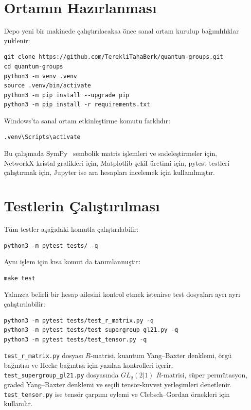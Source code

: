 \documentclass[12pt,a4paper,fleqn]{report}
\numberwithin{equation}{chapter}
\theoremstyle{plain}
\theoremstyle{definition}
\begin{document}
\section{Ortamın Hazırlanması}

Depo yeni bir makinede çalıştırılacaksa önce sanal ortam kurulup bağımlılıklar
yüklenir:
\begin{lstlisting}[style=bashblock]
git clone https://github.com/TerekliTahaBerk/quantum-groups.git
cd quantum-groups
python3 -m venv .venv
source .venv/bin/activate
python3 -m pip install --upgrade pip
python3 -m pip install -r requirements.txt
\end{lstlisting}

Windows'ta sanal ortam etkinleştirme komutu farklıdır:
\begin{lstlisting}[style=bashblock]
.venv\Scripts\activate
\end{lstlisting}

Bu çalışmada SymPy~\cite{SymPy} sembolik matris işlemleri ve sadeleştirmeler için, NetworkX
kristal grafikleri için, Matplotlib şekil üretimi için, pytest testleri
çalıştırmak için, Jupyter ise ara hesapları incelemek için kullanılmıştır.

\section{Testlerin Çalıştırılması}

Tüm testler aşağıdaki komutla çalıştırılabilir:
\begin{lstlisting}[style=bashblock]
python3 -m pytest tests/ -q
\end{lstlisting}

Aynı işlem için kısa komut da tanımlanmıştır:
\begin{lstlisting}[style=bashblock]
make test
\end{lstlisting}

Yalnızca belirli bir hesap ailesini kontrol etmek istenirse test dosyaları ayrı
ayrı çalıştırılabilir:
\begin{lstlisting}[style=bashblock]
python3 -m pytest tests/test_r_matrix.py -q
python3 -m pytest tests/test_supergroup_gl21.py -q
python3 -m pytest tests/test_tensor.py -q
\end{lstlisting}

\texttt{test\_r\_matrix.py} dosyası $R$-matrisi, kuantum Yang--Baxter denklemi,
örgü bağıntısı ve Hecke bağıntısı için yazılan kontrolleri içerir.
\texttt{test\_supergroup\_gl21.py} dosyasında $GL_q(2|1)$ $R$-matrisi, süper
permütasyon, graded Yang--Baxter denklemi ve seçili tensör-kuvvet yerleşimleri
denetlenir. \texttt{test\_tensor.py} ise tensör çarpımı eylemi ve
Clebsch--Gordan örnekleri için kullanılır.
\end{document}

